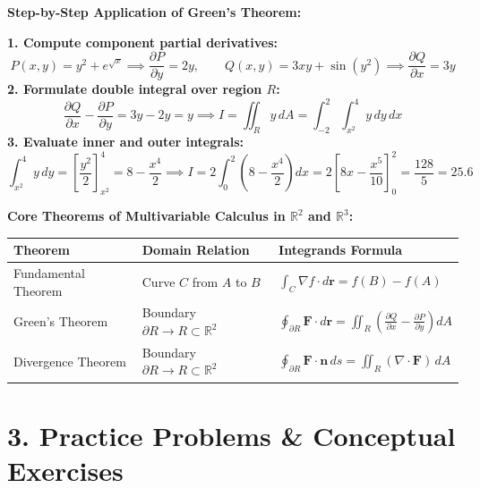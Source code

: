 \documentclass[10pt,a4paper]{article}
\begin{document}
\begin{solutionbox}
\textbf{Step-by-Step Application of Green's Theorem:}

\textbf{1. Compute component partial derivatives:}
\[
P(x,y) = y^2 + e^{\sqrt{x}} \implies \frac{\partial P}{\partial y} = 2y, \qquad Q(x,y) = 3xy + \sin(y^2) \implies \frac{\partial Q}{\partial x} = 3y
\]
\textbf{2. Formulate double integral over region $R$:}
\[
\frac{\partial Q}{\partial x} - \frac{\partial P}{\partial y} = 3y - 2y = y \implies I = \iint_R y \, dA = \int_{-2}^{2} \int_{x^2}^{4} y \, dy \, dx
\]
\textbf{3. Evaluate inner and outer integrals:}
\[
\int_{x^2}^{4} y \, dy = \left[ \frac{y^2}{2} \right]_{x^2}^{4} = 8 - \frac{x^4}{2} \implies I = 2 \int_{0}^{2} \left( 8 - \frac{x^4}{2} \right) dx = 2 \left[ 8x - \frac{x^5}{10} \right]_{0}^{2} = \frac{128}{5} = 25.6
\]
\end{solutionbox}

\newpage


\begin{keyconcept}
\textbf{Core Theorems of Multivariable Calculus in $\mathbb{R}^2$ and $\mathbb{R}^3$:}

\vspace{0.5mm}
\centering
\fontsize{8}{10}\selectfont
\begin{tabular}{@{}lll@{}}
  \toprule
  \textbf{Theorem} & \textbf{Domain Relation} & \textbf{Integrands Formula} \\
  \midrule
  Fundamental Theorem & Curve $C$ from $A$ to $B$ & $\int_C \nabla f \cdot d\mathbf{r} = f(B) - f(A)$ \\{}
  Green's Theorem & Boundary $\partial R \to R \subset \mathbb{R}^2$ & $\oint_{\partial R} \mathbf{F} \cdot d\mathbf{r} = \iint_R \left(\frac{\partial Q}{\partial x} - \frac{\partial P}{\partial y}\right) dA$ \\{}
  Divergence Theorem & Boundary $\partial R \to R \subset \mathbb{R}^2$ & $\oint_{\partial R} \mathbf{F} \cdot \mathbf{n}\,ds = \iint_R (\nabla \cdot \mathbf{F})\,dA$ \\
  \bottomrule
\end{tabular}
\end{keyconcept}

\section*{\color{primary}\large 3. Practice Problems \& Conceptual Exercises}
\end{document}
